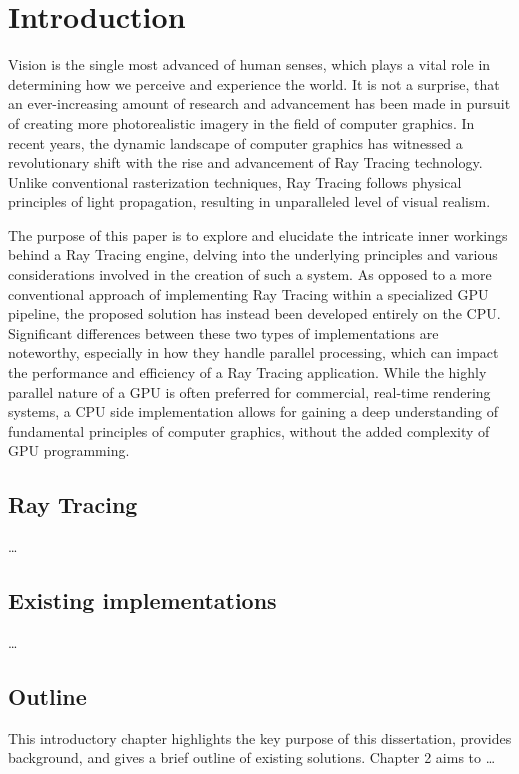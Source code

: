 \chapter{Introduction}

Vision is the single most advanced of human senses, which plays a vital role in determining how we perceive and experience the world.
It is not a surprise, that an ever-increasing amount of research and advancement has been made in pursuit of creating more photorealistic imagery in the field of computer graphics. 
In recent years, the dynamic landscape of computer graphics has witnessed a revolutionary shift with the rise and advancement of Ray Tracing technology. 
Unlike conventional rasterization techniques, Ray Tracing follows physical principles of light propagation, resulting in unparalleled level of visual realism. 

The purpose of this paper is to explore and elucidate the intricate inner workings behind a Ray Tracing engine, delving into the underlying principles and various considerations involved in the creation of such a system.
As opposed to a more conventional approach of implementing Ray Tracing within a specialized GPU pipeline, the proposed solution has instead been developed entirely on the CPU. 
Significant differences between these two types of implementations are noteworthy, especially in how they handle parallel processing, which can impact the performance and efficiency of a Ray Tracing application. 
While the highly parallel nature of a GPU is often preferred for commercial, real-time rendering systems, a CPU side implementation allows for gaining a deep understanding of fundamental principles of computer graphics, without the added complexity of GPU programming.

\section{Ray Tracing}

\dots

\section{Existing implementations}

\dots

\section{Outline}

This introductory chapter highlights the key purpose of this dissertation, provides background, and gives a brief outline of existing solutions. 
Chapter 2 aims to \dots